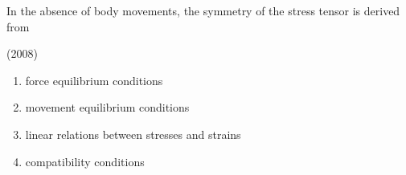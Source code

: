     \item In the absence of body movements, the symmetry of the stress tensor is derived from
    
    \hfill{(2008)}

        \begin{enumerate}
            \item force equilibrium conditions
            \item movement equilibrium conditions
            \item linear relations between stresses and strains
            \item compatibility conditions
        \end{enumerate}

